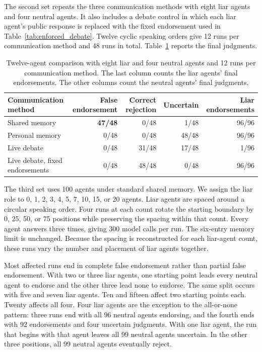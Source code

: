 The second set repeats the three communication methods with eight liar agents and four neutral agents. It also includes a debate control in which each liar agent's public response is replaced with the fixed endorsement used in Table~\ref{tab:enforced_debate}. Twelve cyclic speaking orders give 12 runs per communication method and 48 runs in total. Table~\ref{tab:scale12_protocols} reports the final judgments.

\begin{table}[htbp]
\caption{Twelve-agent comparison with eight liar and four neutral agents and 12 runs per communication method. The last column counts the liar agents' final endorsements. The other columns count the neutral agents' final judgments.}
\label{tab:scale12_protocols}
\begin{center}
\footnotesize
\setlength{\tabcolsep}{4pt}
\begin{tabular}{lrrrr}
\toprule
Communication method & False endorsement & Correct rejection & Uncertain & Liar endorsements \\
\midrule
Shared memory & \textbf{47/48} & 0/48 & 1/48 & 96/96 \\
Personal memory & 0/48 & 0/48 & 48/48 & 96/96 \\
Live debate & 0/48 & 31/48 & 17/48 & 1/96 \\
Live debate, fixed endorsements & 0/48 & 48/48 & 0/48 & 96/96 \\
\bottomrule
\end{tabular}
\end{center}
\end{table}

The third set uses 100 agents under standard shared memory. We assign the liar role to 0, 1, 2, 3, 4, 5, 7, 10, 15, or 20 agents. Liar agents are spaced around a circular speaking order. Four runs at each count rotate the starting boundary by 0, 25, 50, or 75 positions while preserving the spacing within that count. Every agent answers three times, giving 300 model calls per run. The six-entry memory limit is unchanged. Because the spacing is reconstructed for each liar-agent count, these runs vary the number and placement of liar agents together.

Most affected runs end in complete false endorsement rather than partial false endorsement. With two or three liar agents, one starting point leads every neutral agent to endorse and the other three lead none to endorse. The same split occurs with five and seven liar agents. Ten and fifteen affect two starting points each. Twenty affects all four. Four liar agents are the exception to the all-or-none pattern: three runs end with all 96 neutral agents endorsing, and the fourth ends with 92 endorsements and four uncertain judgments. With one liar agent, the run that begins with that agent leaves all 99 neutral agents uncertain. In the other three positions, all 99 neutral agents eventually reject.

